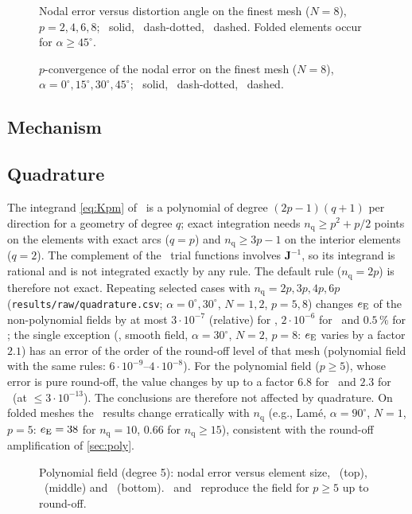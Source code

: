 \begin{figure}[t]
  \centering
  
  \caption{Nodal error versus distortion angle on the finest mesh ($N=8$), $p=2,4,6,8$;
    \PM\ solid, \PH\ dash-dotted, \PP\ dashed. Folded elements occur for $\alpha\ge45^\circ$.}
  \label{fig:alpha}
\end{figure}

\begin{figure}[t]
  \centering
  
  \caption{$p$-convergence of the nodal error on the finest mesh ($N=8$), $\alpha=0^\circ,
    15^\circ, 30^\circ, 45^\circ$; \PM\ solid, \PH\ dash-dotted, \PP\ dashed.}
  \label{fig:p}
\end{figure}

\subsection{Mechanism}\label{sec:mechanism}


\subsection{Quadrature}\label{sec:quad}
The integrand \eqref{eq:Kpm} of \PM\ is a polynomial of degree $(2p-1)(q+1)$ per direction
for a geometry of degree $q$; exact integration needs $n_{\mathrm q}\ge p^2+p/2$ points on the
elements with exact arcs ($q=p$) and $n_{\mathrm q}\ge3p-1$ on the interior elements ($q=2$). The
complement of the \PH\ trial functions involves $\bm J^{-1}$, so its integrand is rational and is
not integrated exactly by any rule. The default rule ($n_{\mathrm q}=2p$) is therefore not exact.
Repeating selected cases with $n_{\mathrm q}=2p,3p,4p,6p$ (\texttt{results/raw/quadrature.csv};
$\alpha=0^\circ,30^\circ$, $N=1,2$, $p=5,8$) changes $e_{\mathrm{E}}$ of the non-polynomial fields by at most
$3\cdot10^{-7}$ (relative) for \PP, $2\cdot10^{-6}$ for \PH\ and $0.5\,\%$ for \PM; the single exception
(\PM, smooth field, $\alpha=30^\circ$, $N=2$, $p=8$: $e_{\mathrm{E}}$ varies by a factor $2.1$) has an error of
the order of the round-off level of that mesh (polynomial field with the same rules:
$6\cdot10^{-9}$--$4\cdot10^{-8}$). For the polynomial field ($p\ge5$), whose error is pure
round-off, the value changes by up to a factor $6.8$ for \PM\ and $2.3$ for \PH\ (at
$\le3\cdot10^{-13}$). The conclusions are therefore not affected by quadrature. On folded meshes the
\PM\ results change erratically with $n_{\mathrm q}$ (e.g., Lam\'e, $\alpha=90^\circ$, $N=1$, $p=5$:
$e_{\mathrm{E}}=38$ for $n_{\mathrm q}=10$, $0.66$ for $n_{\mathrm q}\ge15$), consistent with the round-off amplification of
\cref{sec:poly}.

\begin{figure}[t]
  \centering
  
  \caption{Polynomial field (degree 5): nodal error versus element size, \PM\ (top), \PH\
    (middle) and \PP\ (bottom). \PM\ and \PH\ reproduce the field for $p\ge5$ up to
    round-off.}
  \label{fig:h-poly}
\end{figure}
